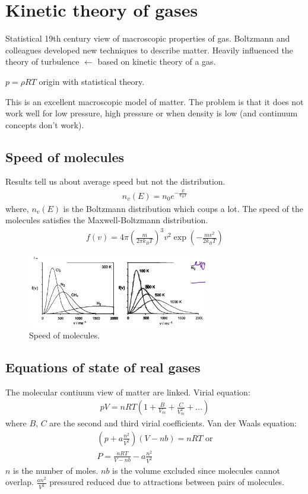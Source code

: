 \section{Kinetic theory of gases}
Statistical 19th century view of macroscopic properties of gas. Boltzmann and colleagues developed new techniques to describe matter. Heavily influenced the theory of turbulence $\leftarrow$ based on kinetic theory of a gas. 

$p = \rho RT$ origin with statistical theory.

This is an excellent macroscopic model of matter. The problem is that it does not work well for low pressure, high pressure or when density is low (and continuum concepts don't work).
\subsection{Speed of molecules}
Results tell us about average speed but not the distribution. 
\begin{gather}
	n_v\left(E\right) = n_0 e^{-\frac{E}{k_B T}}
\end{gather}
where, $n_v\left(E\right)$ is the Boltzmann distribution which coups a lot. The speed of the molecules satisfies the Maxwell-Boltzmann distribution.
\begin{gather}
	f\left(v\right) = 4\pi \left(\frac{m}{2\pi k_B T}\right)^3 v^2 \exp{\left(-\frac{mv^2}{2k_B T}\right)}
\end{gather}
\begin{figure}[H]
	\centering
	\includegraphics[width = 0.7\textwidth]{./img/figure17.png}
	\caption{Speed of molecules.}
\end{figure}
\subsection{Equations of state of real gases}
The molecular contiuum view of matter are linked. Virial equation:
\begin{gather}
	pV = nRT\left(1 + \frac{B}{V_m} + \frac{C}{V_m^2} + \dots\right)
\end{gather}
where $B$, $C$ are the second and third virial coefficients. Van der Waals equation:
\begin{gather}
	\left(p + a\frac{n^2}{V^2}\right)\left(V - nb\right) = nRT \textrm{ or}\\
	P = \frac{nRT}{V- nb} - a \frac{n^2}{V^2}
\end{gather}
$n$ is the number of moles. $nb$ is the volume excluded since molecules cannot overlap. $\frac{an^2}{V^2}$ pressured reduced due to attractions between pairs of molecules.
